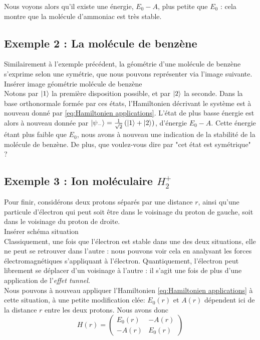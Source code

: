 \documentclass[../notesdecours.tex]{subfiles}
\begin{document}
Nous voyons alors qu'il existe une énergie, $E_0-A$, plus petite que $E_0$ : cela montre que la molécule d'ammoniac est très stable.

\subsection*{Exemple 2 : La molécule de benzène}

Similairement à l'exemple précédent, la géométrie d'une molécule de benzène s'exprime selon une symétrie, que nous pouvons représenter via l'image suivante.\\

\color{red} Insérer image géométrie molécule de benzène \color{black}\\

Notons par $\ket{1}$ la première disposition possible, et par $\ket{2}$ la seconde. Dans la base orthonormale formée par ces états, l'Hamiltonien décrivant le système est à nouveau donné par \eqref{eq:Hamiltonien applications}. L'état de plus basse énergie est alors à nouveau donnée par $\ket{\psi_-} = \frac{1}{\sqrt{2}}\left(\ket{1}+\ket{2}\right)$, d'énergie $E_0-A$. Cette énergie étant plus faible que $E_0$, nous avons à nouveau une indication de la stabilité de la molécule de benzène. De plus, \color{red} que voulez-vous dire par "cet état est symétrique" ? \color{black}

\subsection*{Exemple 3 : Ion moléculaire $H_2^+$}

Pour finir, considérons deux protons séparés par une distance $r$, ainsi qu'une particule d'électron qui peut soit être dans le voisinage du proton de gauche, soit dans le voisinage du proton de droite.\\

\color{red} Insérer schéma situation \color{black}\\

Classiquement, une fois que l'électron est stable dans une des deux situations, elle ne peut se retrouver dans l'autre : nous pouvons voir cela en analysant les forces électromagnétiques s'appliquant à l'électron. Quantiquement, l'électron peut librement se déplacer d'un voisinage à l'autre : il s'agit une fois de plus d'une application de l'\textit{effet tunnel}.\\

Nous pouvons à nouveau appliquer l'Hamiltonien \eqref{eq:Hamiltonien applications} à cette situation, à une petite modification clée: $E_0(r)$ et $A(r)$ dépendent ici de la distance $r$ entre les deux protons. Nous avons donc
\begin{equation}
    H(r) = \begin{pmatrix}
        E_0(r) & -A(r)\\
        -A(r) & E_0(r)
    \end{pmatrix}
\end{equation}
\end{document}
